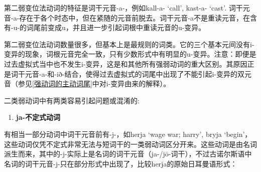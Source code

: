 第二弱变位法动词的特征是词干元音-a-，例如kall-a- `call‌', kast-a- `cast‌'.
词干元音-a-存在于各个时态中，但在紧随的元音前脱去。词干元音-a不是重读元音，在含有-u-的词尾前变成u，并且进一步引起词根中重读元音的u-变异。

第二弱变位法动词数量很多，但基本上是最规则的词类。它的三个基本元间没有i-变异的现象，词根元音完全一致，只有少数形式中有明显的u-变异。注意：即便是过去虚拟式当中也不发生i-变异，这是和其他所有强弱动词的重大区别。其原因正是词干元音-a-和-ið-结合，使得过去虚拟式的词尾中出现了不能引起i-变异的双元音（参见\ref{强动词的主动词尾}中对i-变异由来的解释）。

二类弱动词中有两类容易引起问题或混淆的:

\begin{enumerate}
  \def\labelenumi{\arabic{enumi})}
  \item
        \textbf{ja-不定式动词}
\end{enumerate}

有相当一部分动词中词干元音前有-j-，如herja `wage war; harry', bryja
`begin'，这些动词仅凭不定式非常无法与短词干的一类弱动词区分开来。这些动词是由名词派生而来，其中的-j-实际上是名词的词干元音（ja-/jō-词干），不过古诺尔斯语中名词的词干元音-j-只在部分形式中出现了，比较herja的原始日耳曼语形式：

